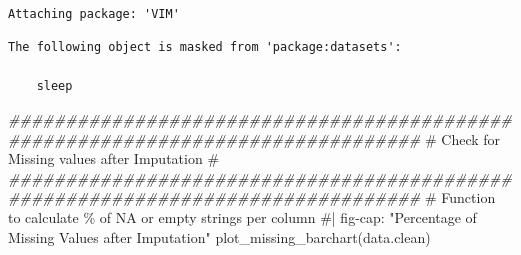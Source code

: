 \documentclass[
  letterpaper,
  DIV=11,
  numbers=noendperiod]{scrartcl}
\newenvironment{Shaded}{\begin{snugshade}}{\end{snugshade}}
\newcommand{\AttributeTok}[1]{\textcolor[rgb]{0.40,0.45,0.13}{#1}}
\newcommand{\CommentTok}[1]{\textcolor[rgb]{0.37,0.37,0.37}{#1}}
\newcommand{\ConstantTok}[1]{\textcolor[rgb]{0.56,0.35,0.01}{#1}}
\newcommand{\DecValTok}[1]{\textcolor[rgb]{0.68,0.00,0.00}{#1}}
\newcommand{\DocumentationTok}[1]{\textcolor[rgb]{0.37,0.37,0.37}{\textit{#1}}}
\newcommand{\FunctionTok}[1]{\textcolor[rgb]{0.28,0.35,0.67}{#1}}
\newcommand{\NormalTok}[1]{\textcolor[rgb]{0.00,0.23,0.31}{#1}}
\newcommand{\OtherTok}[1]{\textcolor[rgb]{0.00,0.23,0.31}{#1}}
\newcommand{\SpecialCharTok}[1]{\textcolor[rgb]{0.37,0.37,0.37}{#1}}
\newcommand{\StringTok}[1]{\textcolor[rgb]{0.13,0.47,0.30}{#1}}
\begin{document}
\begin{verbatim}

Attaching package: 'VIM'
\end{verbatim}

\begin{verbatim}
The following object is masked from 'package:datasets':

    sleep
\end{verbatim}

\begin{Shaded}
\end{Shaded}

\begin{Shaded}
\begin{Highlighting}[]
\DocumentationTok{\#\#\#\#\#\#\#\#\#\#\#\#\#\#\#\#\#\#\#\#\#\#\#\#\#\#\#\#\#\#\#\#\#\#\#\#\#\#\#\#\#\#\#\#\#\#\#\#\#\#\#\#\#\#\#\#\#\#\#\#\#\#\#\#\#\#\#\#\#\#\#\#\#\#\#\#\#\#\#\#}
\CommentTok{\#          Check for Missing values after Imputation                           \#}
\DocumentationTok{\#\#\#\#\#\#\#\#\#\#\#\#\#\#\#\#\#\#\#\#\#\#\#\#\#\#\#\#\#\#\#\#\#\#\#\#\#\#\#\#\#\#\#\#\#\#\#\#\#\#\#\#\#\#\#\#\#\#\#\#\#\#\#\#\#\#\#\#\#\#\#\#\#\#\#\#\#\#\#\#}
\CommentTok{\# Function to calculate \% of NA or empty strings per column}
\CommentTok{\#| fig{-}cap: "Percentage of Missing Values after Imputation"}
\FunctionTok{plot\_missing\_barchart}\NormalTok{(data.clean)}
\end{Highlighting}
\end{Shaded}
\end{document}
